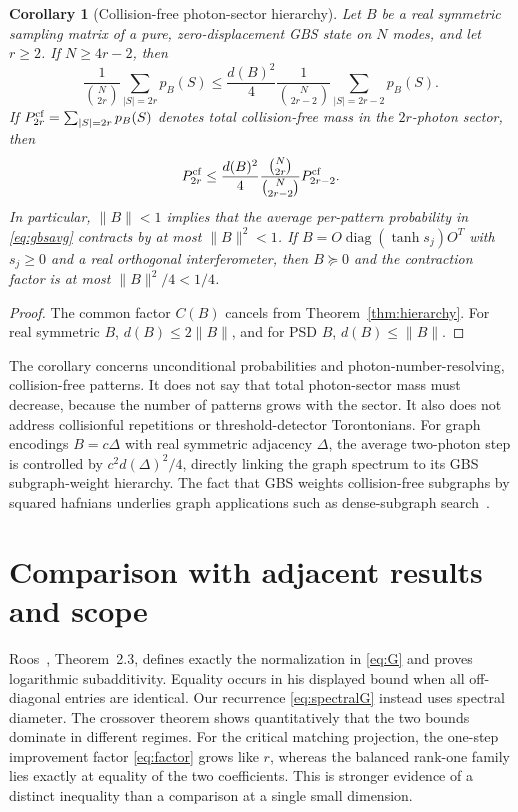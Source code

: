 \documentclass[11pt]{article}
\newtheorem{corollary}[theorem]{Corollary}
\theoremstyle{remark}\newtheorem{remark}[theorem]{Remark}
\begin{document}
\begin{corollary}[Collision-free photon-sector hierarchy]\label{cor:gbs}
Let $B$ be a real symmetric sampling matrix of a pure, zero-displacement
GBS state on $N$ modes, and let $r\ge2$. If
$N\ge4r-2$, then
\begin{equation}\label{eq:gbsavg}
\boxed{
\frac1{\binom N{2r}}\sum_{|S|=2r}p_B(S)
\le\frac{d(B)^2}{4}
\frac1{\binom N{2r-2}}\sum_{|S|=2r-2}p_B(S).
}
\end{equation}
If $P^{\rm cf}_{2r}=\sum_{|S|=2r}p_B(S)$ denotes total collision-free mass in
the $2r$-photon sector, then
\begin{equation}\label{eq:gbstotal}
P^{\rm cf}_{2r}\le\frac{d(B)^2}{4}
\frac{\binom N{2r}}{\binom N{2r-2}}P^{\rm cf}_{2r-2}.
\end{equation}
In particular, $\|B\|<1$ implies that the average per-pattern probability in
\eqref{eq:gbsavg} contracts by at most $\|B\|^2<1$.  If
$B=O\operatorname{diag}(\tanh s_j)O^T$ with $s_j\ge0$ and a real orthogonal interferometer,
then $B\succeq0$ and the contraction factor is at most $\|B\|^2/4<1/4$.
\end{corollary}
\begin{proof}
The common factor $C(B)$ cancels from Theorem~\ref{thm:hierarchy}.  For real
symmetric $B$, $d(B)\le2\|B\|$, and for PSD $B$, $d(B)\le\|B\|$.
\end{proof}

The corollary concerns unconditional probabilities and photon-number-resolving,
collision-free patterns.  It does not say that total photon-sector mass must
decrease, because the number of patterns grows with the sector.  It also does
not address collisionful repetitions or threshold-detector Torontonians.
For graph encodings $B=c\Delta$ with real symmetric adjacency $\Delta$, the
average two-photon step is controlled by $c^2d(\Delta)^2/4$, directly linking
the graph spectrum to its GBS subgraph-weight hierarchy.  The fact that GBS
weights collision-free subgraphs by squared hafnians underlies graph
applications such as dense-subgraph search~\cite{arrazola}.

\section{Comparison with adjacent results and scope}\label{sec:comparison}
Roos~\cite{roos}, Theorem~2.3, defines exactly the normalization in
\eqref{eq:G} and proves logarithmic subadditivity.  Equality occurs in his
displayed bound when all off-diagonal entries are identical.  Our recurrence
\eqref{eq:spectralG} instead uses spectral diameter.  The crossover theorem
shows quantitatively that the two bounds dominate in different regimes.
For the critical matching projection, the one-step improvement factor
\eqref{eq:factor} grows like $r$, whereas the balanced rank-one family lies
exactly at equality of the two coefficients.  This is stronger evidence of a
distinct inequality than a comparison at a single small dimension.
\end{document}

